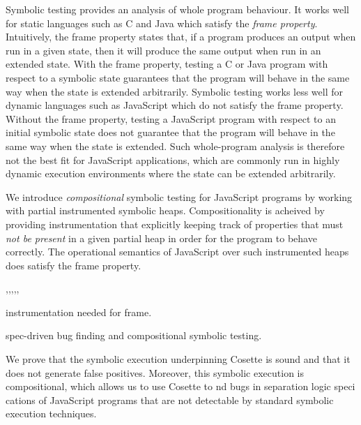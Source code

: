 \documentclass[acmsmall,review,anonymous]{acmart}\settopmatter{printfolios=true,printccs=false,printacmref=false}
\begin{document}
Symbolic testing provides an analysis of whole program behaviour. It
works well for static languages such as C and Java which satisfy the
{\em frame property}. Intuitively, the frame property states that, if
a program produces an output when run in a given state, then it will
produce the same output when run in an extended state. With the frame
property, testing a C or Java program with respect to a symbolic state
guarantees that the program will behave in the same way when the state
is extended arbitrarily.  Symbolic testing works less well for dynamic
languages such as JavaScript which do not satisfy the frame property.
Without the frame property, testing a JavaScript program with respect
to an initial symbolic state does not guarantee that the program will
behave in the same way when the state is extended.  Such whole-program
analysis is therefore not the best fit for JavaScript applications,
which are commonly run in highly dynamic execution environments
 where the state can be extended  arbitrarily. 





 We introduce {\em compositional} symbolic testing for JavaScript
 programs by working with partial instrumented symbolic heaps.
 Compositionality is acheived by providing instrumentation that
 explicitly keeping track of properties that must {\em not be present}
 in a given partial heap in order for the program to behave correctly.
 The operational semantics of JavaScript over such instrumented heaps does satisfy the frame
 property.  

,,,,,







instrumentation needed for frame. 

spec-driven bug finding and compositional symbolic testing. 





We prove that the symbolic execution underpinning Cosette is sound and
that it does not generate false positives. Moreover, this symbolic
execution is compositional, which allows us to use Cosette to  nd bugs
in separation logic speci cations of JavaScript programs that are not
detectable by standard symbolic execution techniques. 

\end{document}
